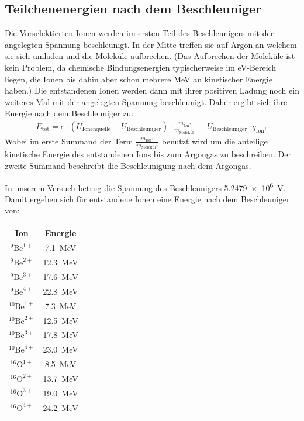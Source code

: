 \subsection{Teilchenenergien nach dem Beschleuniger}
Die Vorselektierten Ionen werden im ersten Teil des Beschleunigers mit der angelegten Spannung beschleunigt.
In der Mitte treffen sie auf Argon an welchem sie sich umladen und die Moleküle aufbrechen.
(Das Aufbrechen der Moleküle ist kein Problem, da chemische Bindungsenergien typischerweise im \si{\electronvolt}-Bereich liegen, die Ionen bis dahin aber schon mehrere \si{\mega\electronvolt} an kinetischer Energie haben.)
Die entstandenen Ionen werden dann mit ihrer positiven Ladung noch ein weiteres Mal mit der angelegten Spannung beschleunigt.
Daher ergibt sich ihre Energie nach dem Beschleuniger zu:
\begin{gather}
    E_{\text{tot}} = e \cdot (U_{\text{Ionenquelle}} + U_{\text{Beschleuniger}}) \cdot \frac{m_{\text{Ion}^{+}}}{m_{\text{Molekül}^{-}}} + U_{\text{Beschleuniger}} \cdot q_{\text{Ion}^{+}}
\end{gather}
Wobei im erste Summand der Term $\frac{m_{\text{Ion}^{+}}}{m_{\text{Molekül}^{-}}}$ benutzt wird um die anteilige kinetische Energie des entstandenen Ions bis zum Argongas zu beschreiben.
Der zweite Summand beschreibt die Beschleunigung nach dem Argongas.

In unserem Versuch betrug die Spannung des Beschleunigers \SI{5.2479e6}{\volt}.
Damit ergeben sich für entstandene Ionen eine Energie nach dem Beschleuniger von:
\begin{center}
  \begin{tabular}{|c|c|}
    \hline
    Ion & Energie \\
    \hline
    $^{9}\text{Be}^{1+}$ & \SI{7.1}{\mega\electronvolt} \\
    $^{9}\text{Be}^{2+}$ & \SI{12.3}{\mega\electronvolt} \\
    $^{9}\text{Be}^{3+}$ & \SI{17.6}{\mega\electronvolt} \\
    $^{9}\text{Be}^{4+}$ & \SI{22.8}{\mega\electronvolt} \\
    \hline
    $^{10}\text{Be}^{1+}$ & \SI{7.3}{\mega\electronvolt} \\
    $^{10}\text{Be}^{2+}$ & \SI{12.5}{\mega\electronvolt} \\
    $^{10}\text{Be}^{3+}$ & \SI{17.8}{\mega\electronvolt} \\
    $^{10}\text{Be}^{4+}$ & \SI{23.0}{\mega\electronvolt} \\
    \hline
    $^{16}\text{O}^{1+}$ & \SI{8.5}{\mega\electronvolt} \\
    $^{16}\text{O}^{2+}$ & \SI{13.7}{\mega\electronvolt} \\
    $^{16}\text{O}^{3+}$ & \SI{19.0}{\mega\electronvolt} \\
    $^{16}\text{O}^{4+}$ & \SI{24.2}{\mega\electronvolt} \\
    \hline
  \end{tabular}
  \label{Auswertung_tab_Ionenenergien_nach_Besch}
\end{center}

